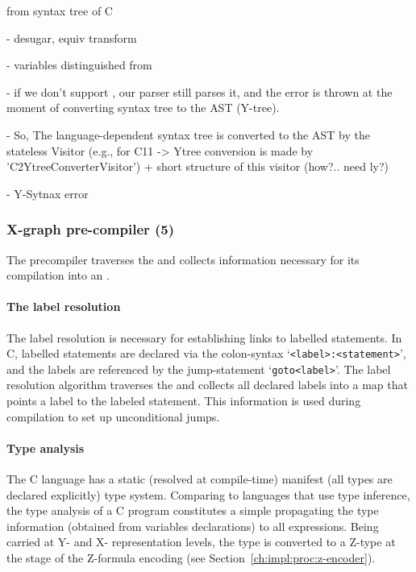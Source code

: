 from  syntax tree of C

- desugar, equiv transform

- variables distinguished from 

- if we don't support , our parser still parses it, and the error is thrown at the moment of converting syntax tree to the AST (Y-tree).

- So, The language-dependent syntax tree is converted to the AST by the stateless Visitor (e.g., for C11 -> Ytree conversion is made by 'C2YtreeConverterVisitor') + short structure of this visitor (how?.. need ly?)

- Y-Sytnax error

\subsubsection{X-graph pre-compiler (5)}
\label{ch:impl:proc:x-pre-compiler}

The precompiler traverses the \ytree{} and collects information necessary for its compilation into an \xgraph{}.



\paragraph{The label resolution}
\label{ch:impl:proc:x-pre-compiler:label}


The label resolution is necessary for establishing links to labelled statements. %
In C, labelled statements are declared via the colon-syntax `\texttt{<label>\;:\;<statement>}', and the labels are referenced by the jump-statement `\texttt{goto\;<label>}'.
The label resolution algorithm traverses the \ytree{} and collects all declared labels into a map that points a label to the labeled statement. %
This information is used during compilation to set up unconditional jumps.


\paragraph{Type analysis}
\label{ch:impl:proc:x-pre-compiler:type}

The C language has a static (resolved at compile-time) manifest (all types are declared explicitly) type system.
Comparing to languages that use type inference, the type analysis of a C program constitutes a simple propagating the type information (obtained from variables declarations) to all expressions. %
Being carried at Y- and X- representation levels, the type is converted to a Z-type at the stage of the Z-formula encoding (see Section~\ref{ch:impl:proc:z-encoder}).

